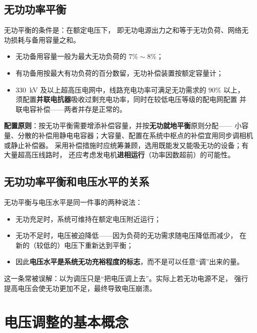 \subsection{无功功率平衡}

无功平衡的条件是：在额定电压下，
即无功电源出力之和等于无功负荷、网络无功损耗与备用容量之和。
\begin{itemize}
  \item 无功备用容量一般为最大无功负荷的 $7\%\sim8\%$；
  \item 有功备用按最大有功负荷的百分数留，无功补偿装置按额定容量计；
  \item 330~kV 及以上超高压电网中，线路充电功率可满足无功需求的 $90\%$ 以上，
        须配置\textbf{并联电抗器}吸收过剩充电功率，同时在较低电压等级的配电网配置
        并联电容补偿——两者并存是正常的。
\end{itemize}
\textbf{配置原则}：按无功平衡需要增添补偿容量，并按\textbf{无功就地平衡}原则分配——
小容量、分散的补偿用静电电容器；大容量、配置在系统中枢点的补偿宜用同步调相机或静止补偿器。
采用补偿措施时应统筹兼顾，选用既能发又能吸无功的设备；有大量超高压线路时，
还应考虑发电机\textbf{进相运行}（功率因数超前）的可能性。

\subsection{无功功率平衡和电压水平的关系}

无功平衡与电压水平是同一件事的两种说法：
\begin{itemize}
  \item 无功充足时，系统可维持在额定电压附近运行；
  \item 无功不足时，电压被迫降低——因为负荷的无功需求随电压降低而减少，
        在新的（较低的）电压下重新达到平衡；
  \item 因此\textbf{电压水平是系统无功充裕程度的标志}，而不是可以任意“调”出来的量。
\end{itemize}
这一条常被误解：以为调压只是“把电压调上去”。实际上若无功电源不足，
强行提高电压会使无功更加不足，最终导致电压崩溃。


\section{电压调整的基本概念}

